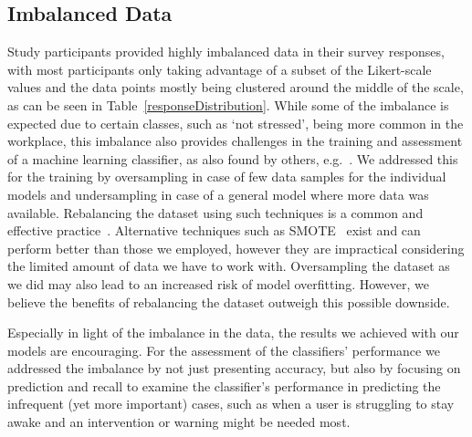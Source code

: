 \subsection{Imbalanced Data}
Study participants provided highly
imbalanced data in their survey responses, with most participants only
taking advantage of a subset of the Likert-scale values and the data
points mostly being clustered around the middle of the scale, as can
be seen in Table~\ref{responseDistribution}. While some of the
imbalance is expected due to certain classes, such as `not stressed',
being more common in the workplace, this imbalance also provides
challenges in the training and assessment of a machine learning
classifier, as also found by others, e.g.~\cite{Exler16}. We addressed
this for the training by oversampling in case of few data samples for
the individual models and undersampling in case of a general model
where more data was available. Rebalancing the dataset using such techniques
is a common and effective practice~\cite{branco2016survey}. Alternative techniques such as SMOTE~\cite{chawla2002smote} exist and can perform better than those we employed, however they are impractical considering the limited amount of data we have to work with. Oversampling the dataset as we did may also lead to an increased risk of model overfitting. However, we believe the benefits of rebalancing the dataset outweigh this possible downside.

Especially in light of the imbalance
in the data, the results we achieved with our models are
encouraging. For the assessment of the classifiers' performance we
addressed the imbalance by not just presenting accuracy, but also by
focusing on prediction and recall to examine the classifier's
performance in predicting the infrequent (yet more important) cases,
such as when a user is struggling to stay awake and an intervention or
warning might be needed most.

